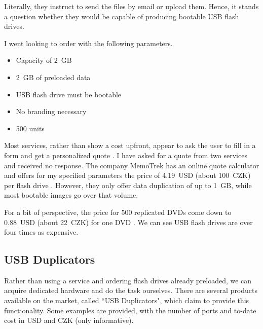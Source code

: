             Literally, they instruct to send the files by email or upload them.  Hence, it stands a question whether they would be capable of producing bootable USB flash drives.
            
            I went looking to order with the following parameters.
            \begin{itemize}
                \item Capacity of 2~GB
                \item 2~GB of preloaded data
                \item USB flash drive must be bootable
                \item No branding necessary
                \item 500 units
            \end{itemize}
            
            Most services, rather than show a cost upfront, appear to ask the user to fill in a form and get a personalized quote \cite{memorysuppliers} \cite{flashbay} \cite{premiumusb}.  I have asked for a quote from two services and received no response.  The company MemoTrek has an online quote calculator and offers for my specified parameters the price of 4.19~USD (about 100~CZK) per flash drive \cite{memotrek-clip-n-easy}.  However, they only offer data duplication of up to 1~GB, while most bootable images go over that volume.
            
            For a bit of perspective, the price for 500 replicated DVDs come down to 0.88~USD (about 22~CZK) for one DVD \cite{discmakers-quoter}.  We can see USB flash drives are over four times as expensive.
        
        \subsection{USB Duplicators}
            Rather than using a service and ordering flash drives already preloaded, we can acquire dedicated hardware and do the task ourselves.  There are several products available on the market, called ``USB Duplicators", which claim to provide this functionality.  Some examples are provided, with the number of ports and to-date cost in USD and CZK (only informative).
            
